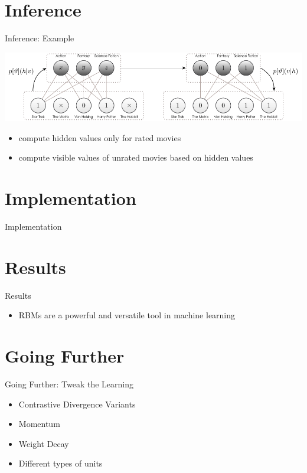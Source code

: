 \documentclass[aspectratio=169]{beamer}
\begin{document}
  \section{Inference} %
  \label{sec:inference}
    \begin{frame}{Inference: Example}
      \begin{center}
        \includegraphics[width=\textwidth]{figures/rbm-inference-example.pdf}
      \end{center}
      \vfill
      \begin{itemize}
        \pause
        \item compute hidden values only for rated movies
        \pause
        \item compute visible values of unrated movies based on hidden values
      \end{itemize}
    \end{frame}

  \section{Implementation} %
  \label{sec:implementation}
    \begin{frame}{Implementation}

    \end{frame}

  \section{Results} %
  \label{sec:results}
    \begin{frame}{Results}
      \begin{itemize}
        \item RBMs are a powerful and versatile tool in machine learning
      \end{itemize}
    \end{frame}

  \section{Going Further} %
  \label{sec:Going Further}
    \begin{frame}{Going Further: Tweak the Learning}
      \begin{itemize}
        \item Contrastive Divergence Variants
        \item Momentum
        \item Weight Decay
        \item Different types of units
      \end{itemize}
    \end{frame}
\end{document}
